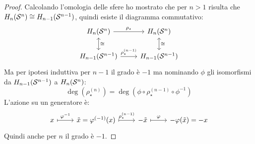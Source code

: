 \begin{proof}
  Calcolando l'omologia delle sfere ho mostrato che per $ n > 1 $ risulta che $ H_n(\mathcal{S}^{n}) \cong H_{n-1}(\mathcal{S}^{n-1}) $,
  quindi esiste il diagramma commutativo:
  \[
    \begin{tikzcd}
      H_n(\Sph{n}) \rar{\rho_\star} \arrow[leftrightarrow]{d}{\cong} & H_n(\Sph{n})  \arrow[leftrightarrow]{d}{\cong} \\
      H_{n-1}(\Sph{n-1}) \rar{\rho_\star^{(n-1)}} &  H_{n-1}(\Sph{n-1})
    \end{tikzcd}
  \]
  Ma per ipotesi induttiva per $ n - 1 $ il grado è $ - 1 $ ma nominando
  $ \phi $ gli isomorfismi da $ H_{n-1}(\mathcal{S}^{n-1}) $ a $ H_n(\mathcal{S}^{n}) $:
  \[
    \deg{(\rho_\star^{(n)})} = \deg{(\phi \circ \rho_\star^{(n-1)} \circ \phi^{-1})}
  \]
  L'azione su un generatore è:
  \[
    \begin{tikzcd}
      x \rar[mapsto]{\phi^{-1}} & \tilde{x} = \phi^{(-1)}(x) \rar[mapsto]{\rho_\star^{(n-1)}} & - \tilde{x} \rar[mapsto]{\phi} & - \phi(\tilde{x}) = -x
    \end{tikzcd}
  \]
  Quindi anche per $ n $ il grado è $ - 1 $.
\end{proof}
\eproof
